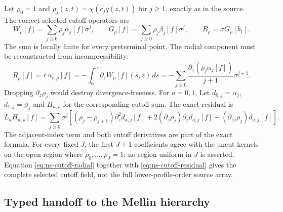 Let $\rho_0=1$ and $\rho_j(z,t)=\chi(c_jq(z,t))$ for $j\geq1$, exactly as
in the source.  The correct selected cutoff operators are
\[
 W_\rho[f]=\sum_{j\geq0}\rho_j\alpha_j[f]\sigma^j,
 \qquad G_\rho[f]=\sum_{j\geq0}\rho_j\beta_j[f]\sigma^j,
 \qquad B_\rho=\sigma G_\rho[b_1].
\]
The sum is locally finite for every preterminal point.  The radial component
must be reconstructed from incompressibility:
\begin{equation}\label{eq:ns-cutoff-radial}
 R_\rho[f]=r\,u_{r,\rho}[f]=-\int_0^\sigma\partial_zW_\rho[f](s,z)\,ds
 =-\sum_{j\geq0}\frac{\partial_z(\rho_j\alpha_j[f])}{j+1}\sigma^{j+1}.
\end{equation}
Dropping $\partial_z\rho_j$ would destroy divergence-freeness.  For $a=0,1$,
Let $d_{0,j}=\alpha_j$, $d_{1,j}=\beta_j$ and $H_{a,\rho}$ for the
corresponding cutoff sum.  The exact residual is
\begin{equation}\label{eq:ns-cutoff-residual}
 L_aH_{a,\rho}[f]=\sum_{j\geq0}\sigma^j\left[
 (\rho_j-\rho_{j+1})\partial_z^2d_{a,j}[f]
 +2(\partial_z\rho_j)\partial_zd_{a,j}[f]
 +(\partial_{zz}\rho_j)d_{a,j}[f]\right].
\end{equation}
The adjacent-index term and both cutoff derivatives are part of the exact
formula.  For every fixed $J$, the first $J+1$ coefficients agree with the
uncut kernels on the open region where $\rho_0,\ldots,\rho_J=1$; no region
uniform in $J$ is asserted.  Equation \eqref{eq:ns-cutoff-radial} together
with \eqref{eq:ns-cutoff-residual} gives the complete selected cutoff field,
not the full lower-profile-order source array.

\subsection{Typed handoff to the Mellin hierarchy}

